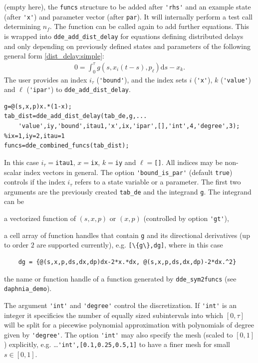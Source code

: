 \documentclass[10pt]{scrartcl}
\renewcommand{\d}{\mathrm{d}}
\newcommand{\blist}[1]{\mbox{\lstinline!#1!}}
\begin{document}
(empty here), the \blist{funcs} structure to be added after
\blist{'rhs'} and an example state (after \blist{'x'}) and parameter
vector (after \blist{par}). It will internally perform a test call
determining $n_f$. The function can be called again to add further equations. This is wrapped into \blist{dde_add_dist_delay} for equations defining distributed delays and only depending on previously defined states and parameters of the following general form \eqref{dist_delay:simple}:
\begin{align}
  \label{dist_delay:rep}
  0=\int_0^\tau g(s,x_i(t-s),p_\ell)\d s-x_k.
\end{align}
The user provides an index $i_\tau$ (\blist{'bound'}), and the index
sets $i$ (\blist{'x'}), $k$ (\blist{'value'}) and $\ell$ (\blist{'ipar'}) to \blist{dde_add_dist_delay}.
\begin{lstlisting}
g=@(s,x,p)x.*(1-x);
tab_dist=dde_add_dist_delay(tab_de,g,...
    'value',iy,'bound',itau1,'x',ix,'ipar',[],'int',4,'degree',3); %ix=1,iy=2,itau=1
funcs=dde_combined_funcs(tab_dist);  
\end{lstlisting}
In this case $i_\tau=$\blist{itau1}, $x=$\blist{ix}, $k=$\blist{iy}
and $\ell=$\blist{[]}. All indices may be non-scalar index vectors in
general. The option \blist{'bound_is_par'} (default \blist{true})
controls if the index $i_\tau$ refers to a state variable or a
parameter.  The first two arguments are the previously created
\blist{tab_de} and the integrand \blist{g}. The integrand can be
\begin{compactitem}
\item a vectorized function of $(s,x,p)$ or $(x,p)$ (controlled by option \blist{'gt'}),
\item a cell array of function handles that contain \blist{g} and its
  directional derivatives (up to order $2$ are supported currently),
  e.g. \blist{[\{g\},dg]}, where in this case
  \begin{lstlisting}
    dg = {@(s,x,p,ds,dx,dp)dx-2*x.*dx, @(s,x,p,ds,dx,dp)-2*dx.^2}
  \end{lstlisting}
\item the name or function handle of a function generated by
  \blist{dde_sym2funcs} (see \texttt{daphnia\_demo}).
\end{compactitem}
The argument \blist{'int'} and \blist{'degree'} control the
discretization. If \blist{'int'} is an integer it specificies the
number of equally sized subintervals into which $[0,\tau]$ will be
split for a piecewise polynomial approximation with polynomials of
degree given by \blist{'degree'}. The option \blist{'int'} may also
specify the mesh (scaled to $[0,1]$) explicitly,
e.g. \ldots\blist{'int',[0.1,0.25,0.5,1]} to have a finer mesh for
small $s\in[0,1]$.
\end{document}
